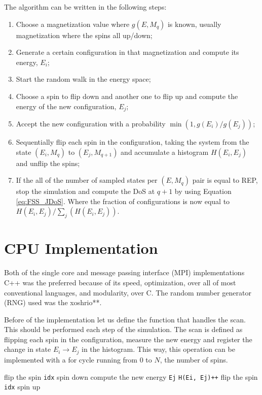 The algorithm can be written in the following steps:
\begin{enumerate}
\item Choose a magnetization value where $g(E, M_q)$ is known, usually magnetization where the spins all up/down;
\item Generate a certain configuration in that magnetization and compute its energy, $E_i$;                                                                                                                                       
\item Start the random walk in the energy space;
\item Choose a spin to flip down and another one to flip up and compute the energy of the new configuration, $E_j$;
\item Accept the new configuration with a probability $\min(1, g(E_i)/g(E_j))$;
\item Sequentially flip each spin in the configuration, taking the system from the state $(E_i, M_q)$ to $(E_j, M_{q+1})$ and accumulate a histogram $H(E_i, E_j)$ and unflip the spins;
\item If the all of the number of sampled states per $(E,M_{q})$ pair is equal to REP, stop the simulation and compute the DoS at $q+1$ by using Equation \ref{eq:FSS_JDoS}. Where the fraction of configurations is now equal to $H(E_i, E_j)/\sum_j(H(E_i,E_j))$.
\end{enumerate}

\section{CPU Implementation}

	Both of the single core and message passing interface (MPI) implementations C++ was the preferred because of its speed, optimization, over all of most conventional languages, and modularity, over C. The random number generator (RNG) used was the xoshrio**.

	Before of the implementation let us define the function that handles the scan. This should be performed each step of the simulation. The scan is defined as flipping each spin in the configuration, measure the new energy and register the change in state $E_i \rightarrow E_j$ in the histogram. This way, this operation can be implemented with a for cycle running from $0$ to $N$, the number of spins.
\begin{algorithm}
	\begin{algorithmic}[1]
			\State flip the spin \texttt{idx} spin down
			\State compute the new energy \texttt{Ej}
			\State \texttt{H(Ei, Ej)++}
			\State flip the spin \texttt{idx} spin up
		\EndFor
	\EndFunction
	\end{algorithmic} 
\end{algorithm} 

